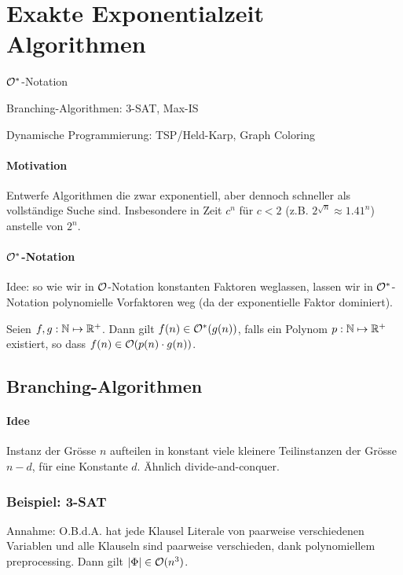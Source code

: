 \section{Exakte Exponentialzeit Algorithmen}

\begin{takeaway}
    \item $\mathcal{O}^*$-Notation
    \item Branching-Algorithmen: 3-SAT, Max-IS
    \item Dynamische Programmierung: TSP/Held-Karp, Graph Coloring
\end{takeaway}

\paragraph{Motivation}
Entwerfe Algorithmen die zwar exponentiell, aber dennoch schneller als vollständige Suche sind.
Insbesondere in Zeit $c^n$ für $c < 2$ (z.B. $2^{\sqrt{n}} \approx 1.41^n$) anstelle von $2^n$.

\paragraph{$\mathcal{O}^*$-Notation}
Idee: so wie wir in $\mathcal{O}$-Notation konstanten Faktoren weglassen, lassen wir in $\mathcal{O}^*$-Notation
polynomielle Vorfaktoren weg (da der exponentielle Faktor dominiert).

Seien $f,g : \mathbb{N} \mapsto \mathbb{R}^+$. Dann gilt $f(n) \in \mathcal{O}^*(g(n))$, falls ein Polynom $p : \mathbb{N} \mapsto \mathbb{R}^+$
existiert, so dass $f(n) \in \mathcal{O}(p(n) \cdot g(n))$.


\subsection{Branching-Algorithmen}

\paragraph{Idee}
Instanz der Grösse $n$ aufteilen in konstant viele kleinere Teilinstanzen der Grösse $n-d$, für eine Konstante $d$.
Ähnlich divide-and-conquer.


\subsubsection{Beispiel: 3-SAT}

Annahme: O.B.d.A. hat jede Klausel Literale von paarweise verschiedenen Variablen und alle Klauseln sind
paarweise verschieden, dank polynomiellem preprocessing.
Dann gilt $|\Phi| \in \mathcal{O}(n^3)$.

